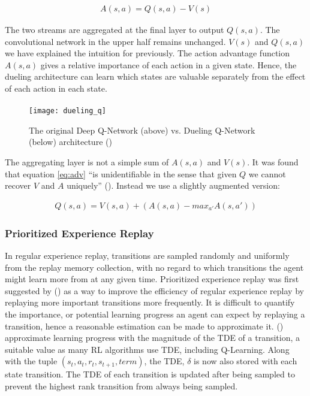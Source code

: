 \begin{align}
    \label{eq:adv}
    A(s, a) =  Q(s, a) - V(s)
\end{align}

The two streams are aggregated at the final layer to output $Q(s, a)$. The convolutional network in the upper half remains unchanged. $V(s)$ and $Q(s, a)$ we have explained the intuition for previously. The action advantage function $A(s, a)$ gives a relative importance of each action in a given state. Hence, the dueling architecture can learn which states are valuable separately from the effect of each action in each state. \paragraph{}

\begin{figure}[h]
    \centering
    \texttt{[image: dueling\_q]}
    \caption{The original Deep Q-Network (above) vs. Dueling Q-Network (below) architecture (\citet{dueling})}
\end{figure}

The aggregating layer is not a simple sum of $A(s, a)$ and $V(s)$. It was found that equation \ref{eq:adv} ``is unidentifiable in the sense that given $Q$ we cannot recover $V$ and $A$ uniquely'' (\citet{dueling}). Instead we use a slightly augmented version:

\begin{align}
    Q(s, a) = V(s, a) + (A(s, a) - max_{a'} A(s, a'))
\end{align}

\subsubsection{Prioritized Experience Replay}
In regular experience replay, transitions are sampled randomly and uniformly from the replay memory collection, with no regard to which transitions the agent might learn more from at any given time. Prioritized experience replay was first suggested by (\citet{prioritized}) as a way to improve the efficiency of regular experience replay by replaying more important transitions more frequently. It is difficult to quantify the importance, or potential learning progress an agent can expect by replaying a transition, hence a reasonable estimation can be made to approximate it. (\citet{prioritized}) approximate learning progress with the magnitude of the TDE of a transition, a suitable value as many RL algorithms use TDE, including Q-Learning. Along with the tuple $(s_t, a_t, r_{t}, s_{t+1}, term)$, the TDE, $\delta$ is now also stored with each state transition. The TDE of each transition is updated after being sampled to prevent the highest rank transition from always being sampled. \paragraph{}


